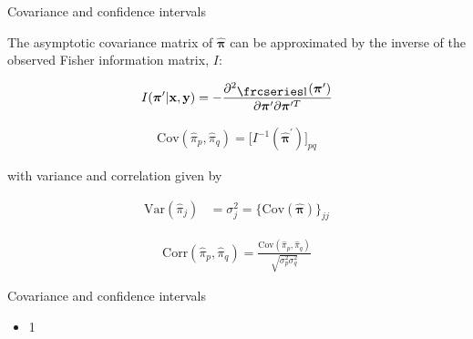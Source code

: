 \documentclass{beamer}
\newcommand{\textfrc}[1]{{\frcseries#1}}
\newcommand{\mathfrc}[1]{\raisebox{-0.8mm}{\text{\textfrc{\small #1}}}\hspace{0.4mm}}
\newcommand{\eqn}[1]{\begin{align*}
#1
\end{align*}}
\newcommand{\vect}[1]{\boldsymbol{\mathbf{#1}}}
\newcommand{\Bl}{\Big\{}
\newcommand{\Br}{\Big\}}
\newcommand{\vx}{\vect{x}}
\newcommand{\vy}{\vect{y}}
\newcommand{\vp}{\vect{\pi}}
\newcommand{\vph}{\hat{\vect{\pi}}}
\newcommand{\vpg}{\vp^{\prime}}
\newcommand{\vpgh}{\hat{\vp}^{\prime}}
\newcommand{\llpp}{\mathfrc{l}(\vpg)}
\begin{document}
\begin{frame}{Covariance and confidence intervals}
	
	The asymptotic covariance matrix of $\vph$ can be approximated by the inverse of the observed Fisher information matrix, $I$:
	
	\eqn{	
		I(\vpg|\vx,\vy)=-\frac{\partial^2 \llpp}{\partial \vp^\prime \partial \vp^{\prime T}}
	}
	
	
	
	\eqn{
		\text{Cov}(\hat{\pi}_p,\hat{\pi}_q) = \big[I^{-1}(\vpgh) \big]_{pq}
	}
	
	\;\;
	with variance and correlation given by
	
	\eqn{
		\text{Var}(\hat{\pi}_j) &= \sigma^2_j = \Bl  \text{Cov}(\vph) \Br_{jj}
	}
	
	\eqn{
		\text{Corr}(\hat{\pi}_p,\hat{\pi}_q) = \frac{\text{Cov}(\hat{\pi}_p,\hat{\pi}_q)}{\sqrt{\sigma^2_p \sigma^2_q}}
	}
	

	
\end{frame}
\begin{frame}[shrink]{Covariance and confidence intervals}
	
	\begin{itemize}
		\item 1
	\end{itemize}
	
\end{frame}
\end{document}
